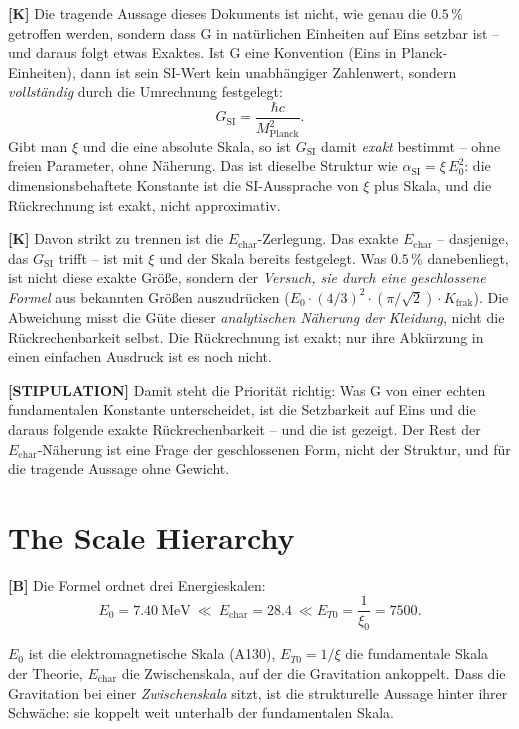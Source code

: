 \textbf{[K]} Die tragende Aussage dieses Dokuments ist nicht, wie genau die
$0{.}5\,\%$ getroffen werden, sondern dass G in natürlichen Einheiten auf Eins
setzbar ist -- und daraus folgt etwas Exaktes. Ist G eine Konvention (Eins in
Planck-Einheiten), dann ist sein SI-Wert kein unabhängiger Zahlenwert, sondern
\emph{vollständig} durch die Umrechnung festgelegt:
\[
  G_\text{SI} = \frac{\hbar c}{M_\text{Planck}^2} .
\]
Gibt man $\xi$ und die eine absolute Skala, so ist $G_\text{SI}$ damit
\emph{exakt} bestimmt -- ohne freien Parameter, ohne Näherung. Das ist dieselbe
Struktur wie $\alpha_\text{SI} = \xi\,E_0^2$: die dimensionsbehaftete Konstante
ist die SI-Aussprache von $\xi$ plus Skala, und die Rückrechnung ist exakt, nicht
approximativ.

\textbf{[K]} Davon strikt zu trennen ist die $E_\text{char}$-Zerlegung. Das exakte
$E_\text{char}$ -- dasjenige, das $G_\text{SI}$ trifft -- ist mit $\xi$ und der
Skala bereits festgelegt. Was $0{.}5\,\%$ danebenliegt, ist nicht diese exakte
Größe, sondern der \emph{Versuch, sie durch eine geschlossene Formel} aus
bekannten Größen auszudrücken ($E_0\cdot(4/3)^2\cdot(\pi/\sqrt2)\cdot
K_\text{frak}$). Die Abweichung misst die Güte dieser \emph{analytischen
Näherung der Kleidung}, nicht die Rückrechenbarkeit selbst. Die Rückrechnung ist
exakt; nur ihre Abkürzung in einen einfachen Ausdruck ist es noch nicht.

\textbf{[STIPULATION]} Damit steht die Priorität richtig: Was G von einer echten
fundamentalen Konstante unterscheidet, ist die Setzbarkeit auf Eins und die
daraus folgende exakte Rückrechenbarkeit -- und die ist gezeigt. Der Rest der
$E_\text{char}$-Näherung ist eine Frage der geschlossenen Form, nicht der
Struktur, und für die tragende Aussage ohne Gewicht.

\section{The Scale Hierarchy}

\textbf{[B]} Die Formel ordnet drei Energieskalen:
\[
  E_0 = 7{.}40\ \text{MeV}\ \ll\ E_\text{char} = 28{.}4\ \ll  E_{T0} = \frac{1}{\xi_0} = 7500 .
\]

$E_0$ ist die elektromagnetische Skala (A130), $E_{T0}=1/\xi$ die
fundamentale Skala der Theorie, $E_\text{char}$ die Zwischenskala, auf der die
Gravitation ankoppelt. Dass die Gravitation bei einer \emph{Zwischenskala}
sitzt, ist die strukturelle Aussage hinter ihrer Schwäche: sie koppelt weit
unterhalb der fundamentalen Skala.

